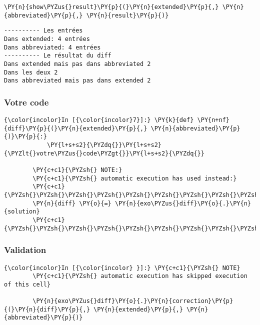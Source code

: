 \begin{Verbatim}[commandchars=\\\{\}]
        \PY{n}{show\PYZus{}result}\PY{p}{(}\PY{n}{extended}\PY{p}{,} \PY{n}{abbreviated}\PY{p}{,} \PY{n}{result}\PY{p}{)}
\end{Verbatim}


    \begin{Verbatim}[commandchars=\\\{\}]
---------- Les entrées
Dans extended: 4 entrées
Dans abbreviated: 4 entrées
---------- Le résultat du diff
Dans extended mais pas dans abbreviated 2
Dans les deux 2
Dans abbreviated mais pas dans extended 2

    \end{Verbatim}

    \hypertarget{votre-code}{%
\subsubsection{Votre code}\label{votre-code}}

    \begin{Verbatim}[commandchars=\\\{\}]
{\color{incolor}In [{\color{incolor}7}]:} \PY{k}{def} \PY{n+nf}{diff}\PY{p}{(}\PY{n}{extended}\PY{p}{,} \PY{n}{abbreviated}\PY{p}{)}\PY{p}{:}
            \PY{l+s+s2}{\PYZdq{}}\PY{l+s+s2}{\PYZlt{}votre\PYZus{}code\PYZgt{}}\PY{l+s+s2}{\PYZdq{}}
        
        \PY{c+c1}{\PYZsh{} NOTE:}
        \PY{c+c1}{\PYZsh{} automatic execution has used instead:}
        \PY{c+c1}{\PYZsh{}\PYZsh{}\PYZsh{}\PYZsh{}\PYZsh{}\PYZsh{}\PYZsh{}\PYZsh{}\PYZsh{}\PYZsh{}}
        \PY{n}{diff} \PY{o}{=} \PY{n}{exo\PYZus{}diff}\PY{o}{.}\PY{n}{solution}
        \PY{c+c1}{\PYZsh{}\PYZsh{}\PYZsh{}\PYZsh{}\PYZsh{}\PYZsh{}\PYZsh{}\PYZsh{}\PYZsh{}\PYZsh{}}
\end{Verbatim}


    \hypertarget{validation}{%
\subsubsection{Validation}\label{validation}}

    \begin{Verbatim}[commandchars=\\\{\}]
{\color{incolor}In [{\color{incolor} }]:} \PY{c+c1}{\PYZsh{} NOTE}
        \PY{c+c1}{\PYZsh{} automatic execution has skipped execution of this cell}
        
        \PY{n}{exo\PYZus{}diff}\PY{o}{.}\PY{n}{correction}\PY{p}{(}\PY{n}{diff}\PY{p}{,} \PY{n}{extended}\PY{p}{,} \PY{n}{abbreviated}\PY{p}{)}
\end{Verbatim}


